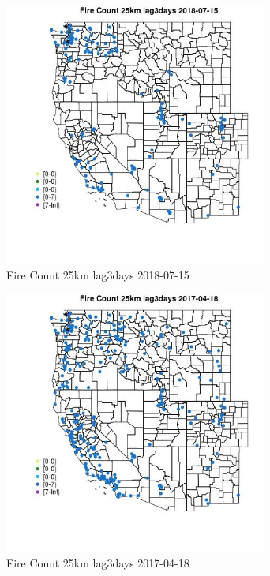 \begin{figure} 
\centering  
\includegraphics[width=0.77\textwidth]{Code_Outputs/Report_ML_input_PM25_Step4_part_e_de_duplicated_aves_compiled_2019-05-20wNAs_MapObsFire_Count_25km_lag3days2018-07-15.jpg} 
\caption{\label{fig:Report_ML_input_PM25_Step4_part_e_de_duplicated_aves_compiled_2019-05-20wNAsMapObsFire_Count_25km_lag3days2018-07-15}Fire Count 25km lag3days 2018-07-15} 
\end{figure} 
 

\begin{figure} 
\centering  
\includegraphics[width=0.77\textwidth]{Code_Outputs/Report_ML_input_PM25_Step4_part_e_de_duplicated_aves_compiled_2019-05-20wNAs_MapObsFire_Count_25km_lag3days2017-04-18.jpg} 
\caption{\label{fig:Report_ML_input_PM25_Step4_part_e_de_duplicated_aves_compiled_2019-05-20wNAsMapObsFire_Count_25km_lag3days2017-04-18}Fire Count 25km lag3days 2017-04-18} 
\end{figure} 
 

